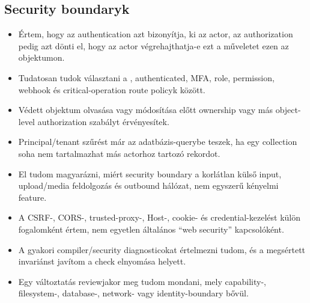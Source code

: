 \subsection*{Security boundaryk}
\begin{itemize}[label={\texttt{[ ]}},leftmargin=2em]
  \item Értem, hogy az authentication azt bizonyítja, ki az actor, az authorization pedig azt dönti el, hogy az actor végrehajthatja-e ezt a műveletet ezen az objektumon.
  \item Tudatosan tudok választani a , authenticated, MFA, role, permission, webhook és critical-operation route policyk között.
  \item Védett objektum olvasása vagy módosítása előtt ownership vagy más object-level authorization szabályt érvényesítek.
  \item Principal/tenant szűrést már az adatbázis-querybe teszek, ha egy collection soha nem tartalmazhat más actorhoz tartozó rekordot.
  \item El tudom magyarázni, miért security boundary a korlátlan külső input, upload/media feldolgozás és outbound hálózat, nem egyszerű kényelmi feature.
  \item A CSRF-, CORS-, trusted-proxy-, Host-, cookie- és credential-kezelést külön fogalomként értem, nem egyetlen általános ``web security'' kapcsolóként.
  \item A gyakori compiler/security diagnosticokat értelmezni tudom, és a megsértett invariánst javítom a check elnyomása helyett.
  \item Egy változtatás reviewjakor meg tudom mondani, mely capability-, filesystem-, database-, network- vagy identity-boundary bővül.
\end{itemize}

